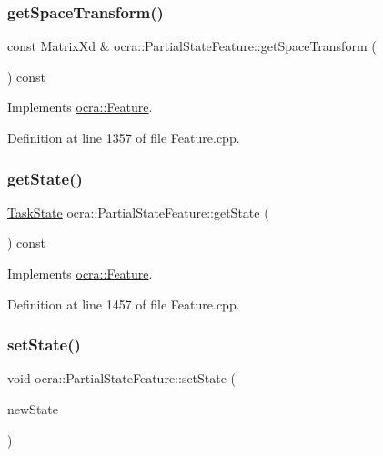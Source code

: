 \subsubsection{\texorpdfstring{get\+Space\+Transform()}{getSpaceTransform()}}
{\footnotesize\ttfamily const Matrix\+Xd \& ocra\+::\+Partial\+State\+Feature\+::get\+Space\+Transform (\begin{DoxyParamCaption}{ }\end{DoxyParamCaption}) const\hspace{0.3cm}{\ttfamily [virtual]}}



Implements \hyperlink{classocra_1_1Feature_a77eb324fb4da91fd50d0e761d2453ff3}{ocra\+::\+Feature}.



Definition at line 1357 of file Feature.\+cpp.

\hypertarget{classocra_1_1PartialStateFeature_abb71a3727198affb3d250e6942fb6eee}{}\label{classocra_1_1PartialStateFeature_abb71a3727198affb3d250e6942fb6eee} 
\subsubsection{\texorpdfstring{get\+State()}{getState()}}
{\footnotesize\ttfamily \hyperlink{classocra_1_1TaskState}{Task\+State} ocra\+::\+Partial\+State\+Feature\+::get\+State (\begin{DoxyParamCaption}{ }\end{DoxyParamCaption}) const\hspace{0.3cm}{\ttfamily [virtual]}}



Implements \hyperlink{classocra_1_1Feature_a792434ceb793f25874b8fe42ae24c475}{ocra\+::\+Feature}.



Definition at line 1457 of file Feature.\+cpp.

\hypertarget{classocra_1_1PartialStateFeature_a89e830a1d3bea028431c4ae0844a6d95}{}\label{classocra_1_1PartialStateFeature_a89e830a1d3bea028431c4ae0844a6d95} 
\subsubsection{\texorpdfstring{set\+State()}{setState()}}
{\footnotesize\ttfamily void ocra\+::\+Partial\+State\+Feature\+::set\+State (\begin{DoxyParamCaption}\item[{const \hyperlink{classocra_1_1TaskState}{Task\+State} \&}]{new\+State }\end{DoxyParamCaption})\hspace{0.3cm}{\ttfamily [virtual]}}



